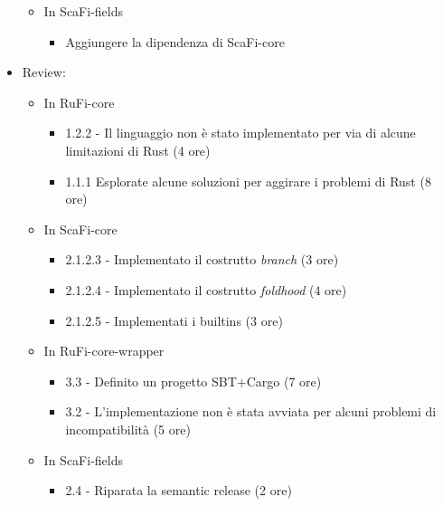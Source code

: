 \documentclass[12pt, a4paper]{article}
\begin{document}
\begin{itemize}
\begin{itemize}
              \item In ScaFi-fields
                    \begin{itemize}
                        \item Aggiungere la dipendenza di ScaFi-core
                    \end{itemize}
          \end{itemize}
    \item Review:
          \begin{itemize}
              \color{teal}
              \item In RuFi-core
                    \begin{itemize}
                        \item 1.2.2 - Il linguaggio non è stato implementato per via di alcune limitazioni di Rust (4 ore)
                        \item 1.1.1 Esplorate alcune soluzioni per aggirare i problemi di Rust (8 ore)
                    \end{itemize}
                    \color{cyan}
              \item In ScaFi-core
                    \begin{itemize}
                        \item 2.1.2.3 - Implementato il costrutto \textit{branch} (3 ore)
                        \item 2.1.2.4 - Implementato il costrutto \textit{foldhood} (4 ore)
                        \item 2.1.2.5 - Implementati i builtins (3 ore)
                    \end{itemize}
                    \color{magenta}
              \item In RuFi-core-wrapper
                    \begin{itemize}
                        \item 3.3 - Definito un progetto SBT+Cargo (7 ore)
                        \item 3.2 - L'implementazione non è stata avviata per alcuni problemi di incompatibilità (5 ore)
                    \end{itemize}
                    \color{blue}

              \item In ScaFi-fields
                    \begin{itemize}
                        \item 2.4 - Riparata la semantic release (2 ore)
                    \end{itemize}
          \end{itemize}
\end{itemize}
\end{document}
